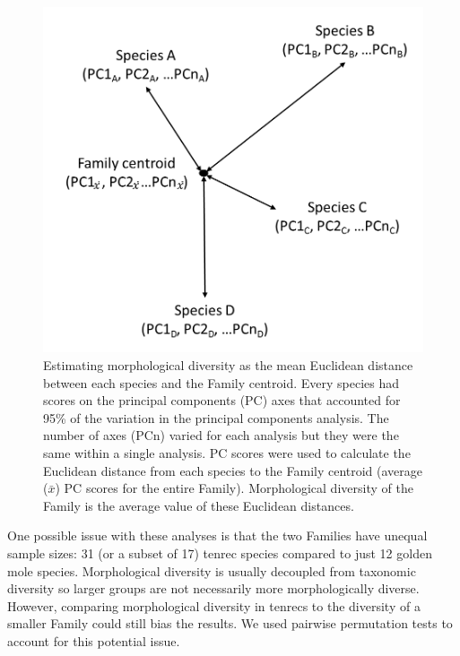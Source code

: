 \documentclass[12pt,a4paper]{article}
\begin{document}
	\begin{figure}[!htbp]
	\centering
	\includegraphics [width=0.7\linewidth, height=0.7\textheight, keepaspectratio]{figures/Centroids.png}
	\caption[Calculating diversity as mean Euclidean distance to Family centroid.]
		{Estimating morphological diversity as the mean Euclidean distance between each species and the Family centroid. Every species had scores on the principal components (PC) axes that accounted for 95\% of the variation in the principal components analysis. The number of axes (PCn) varied for each analysis but they were the same within a single analysis. PC scores were used to calculate the Euclidean distance from each species to the Family centroid (average (\begin{math}
			\bar{x}
			\end{math}) PC scores for the entire Family). Morphological diversity of the Family is the average value of these Euclidean distances.}
	\label{fig:centroids}
	\end{figure}	
	One possible issue with these analyses is that the two Families have unequal sample sizes: 31 (or a subset of 17) tenrec species compared to just 12 golden mole species. Morphological diversity is usually decoupled from taxonomic diversity \citep[e.g.][]{Ruta2013, Hopkins2013} so larger groups are not necessarily more morphologically diverse. However, comparing morphological diversity in tenrecs to the diversity of a smaller Family could still bias the results. We used pairwise permutation tests to account for this potential issue. 
\end{document}

